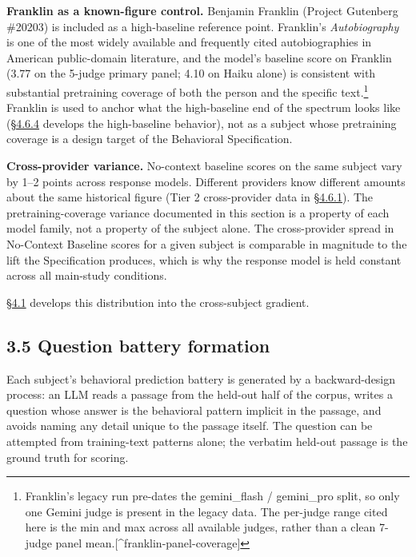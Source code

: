 \textbf{Franklin as a known-figure control.} Benjamin Franklin (Project
Gutenberg \#20203) is included as a high-baseline reference point.
Franklin's \emph{Autobiography} is one of the most widely available and
frequently cited autobiographies in American public-domain literature,
and the model's baseline score on Franklin (3.77 on the 5-judge primary
panel; 4.10 on Haiku alone) is consistent with substantial pretraining
coverage of both the person and the specific text.\footnote{Franklin's
  legacy run pre-dates the gemini\_flash / gemini\_pro split, so only
  one Gemini judge is present in the legacy data. The per-judge range
  cited here is the min and max across all available judges, rather than
  a clean 7-judge panel mean.{[}\^{}franklin-panel-coverage{]}} Franklin
is used to anchor what the high-baseline end of the spectrum looks like
(\hyperref[statistical-rigor-checks-on-the-headline-gradient]{§4.6.4} develops the high-baseline behavior), not as a subject whose
pretraining coverage is a design target of the Behavioral Specification.

\textbf{Cross-provider variance.} No-context baseline scores on the same
subject vary by 1--2 points across response models. Different providers
know different amounts about the same historical figure (Tier 2
cross-provider data in \hyperref[cross-provider-response-generation-tier-2-replication]{§4.6.1}). The pretraining-coverage variance
documented in this section is a property of each model family, not a
property of the subject alone. The cross-provider spread in No-Context
Baseline scores for a given subject is comparable in magnitude to the
lift the Specification produces, which is why the response model is held
constant across all main-study conditions.

\hyperref[the-cross-subject-gradient-and-its-per-question-mechanism]{§4.1} develops this distribution into the cross-subject gradient.

\hypertarget{question-battery-formation}{%
\subsection{3.5 Question battery
formation}\label{question-battery-formation}}

Each subject's behavioral prediction battery is generated by a
backward-design process: an LLM reads a passage from the held-out half
of the corpus, writes a question whose answer is the behavioral pattern
implicit in the passage, and avoids naming any detail unique to the
passage itself. The question can be attempted from training-text
patterns alone; the verbatim held-out passage is the ground truth for
scoring.

